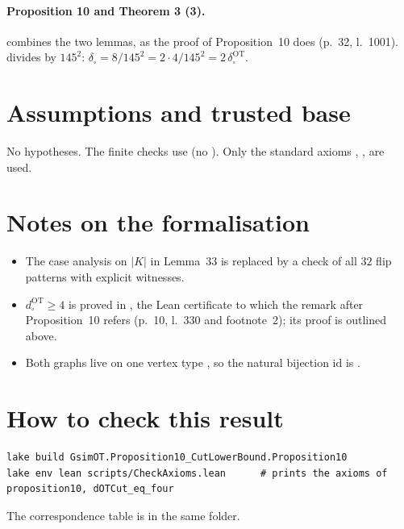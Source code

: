 \paragraph{Proposition 10 and Theorem 3 (3).}  combines the two lemmas, as the proof of
Proposition~10 does (p.~32, l.~1001).  divides by
$145^2$: $\delta_\square=8/145^2=2\cdot4/145^2=2\,\delta^{\mathrm{OT}}_\square$.

\section{Assumptions and trusted base}
No hypotheses. The finite checks use  (no ). Only the standard axioms
, ,  are used.

\section{Notes on the formalisation}
\begin{itemize}
\item The case analysis on $|K|$ in Lemma~33 is replaced by a check of all $32$ flip patterns with explicit witnesses.
\item $d^{\mathrm{OT}}_\square\ge4$ is proved in , the Lean certificate to which the remark after
Proposition~10 refers (p.~10, l.~330 and footnote~2); its proof is outlined above.
\item Both graphs live on one vertex type , so the natural bijection $\mathrm{id}$ is .
\end{itemize}

\section{How to check this result}
\begin{verbatim}
lake build GsimOT.Proposition10_CutLowerBound.Proposition10
lake env lean scripts/CheckAxioms.lean      # prints the axioms of proposition10, dOTCut_eq_four
\end{verbatim}
The correspondence table is  in the same folder.

